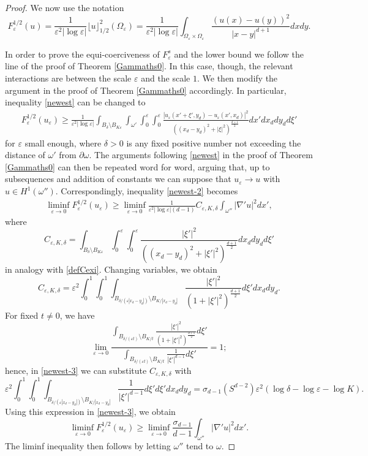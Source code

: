 \documentclass[11pt]{article}
\def\e{\varepsilon}
\begin{document}
\begin{proof} We now use the notation
$$
F^{1/2}_\e(u)=\frac{1}{\e^{2}|\log\e|}\lfloor u\rfloor_{1/2}^2(\Omega_\e)
=\frac{1}{\e^{2}|\log\e|}\int_{\Omega_\e\times\Omega_\e}\frac{(u(x)-u(y))^2}{|x-y|^{d+1}}dx dy.
$$

In order to prove the equi-coerciveness of $F^s_\e$ and the lower bound we follow the line of the proof of Theorem \ref{Gammaths0}. In this case, though, the relevant interactions are between the scale $\e$ and the scale $1$.
We then modify the argument in the proof of Theorem \ref{Gammaths0} accordingly.  In particular, inequality \eqref{newest} can be changed to 
\begin{eqnarray}
\label{newest-1}
F^{1/2}_\e(u_\e)\ge\frac{1}{\e^{2}
|\log\e|}\int_{B_\delta\setminus B_{K\e}}\int_{\omega'}
\int_0^\e\int_0^\e \frac{|u_\e(x'+\xi',y_d)-u_\e(x',x_d)|^2}{((x_d-y_d)^2+|\xi|^2)^{\frac{d+1}2}}dx' dx_d dy_d d\xi'
\end{eqnarray}
for $\e$ small enough, where $\delta>0$ is any fixed positive number not exceeding the distance of $\omega'$ from $\partial\omega$. 
The arguments following \eqref{newest} in the proof of Theorem \ref{Gammaths0} can then be repeated word for word, arguing that, up to subsequences and addition of constants we can suppose that $u_\e\to u$ with $u\in H^1(\omega'')$. Correspondingly, inequality \eqref{newest-2} becomes
\begin{eqnarray}\label{newest-3}
\liminf_{\e\to 0}F^{1/2}_\e(u_\e)\ge\liminf_{\e\to 0}\frac{1}{\e^{2}|\log\e|(d-1)}C_{\e,K,\delta}
\int_{\omega''} |\nabla' u|^2 dx',
\end{eqnarray}
where
$$C_{\e,K,\delta}=
\int_{B_\delta\setminus B_{K\e}}\int_0^\e\int_0^\e\frac{|\xi'|^2 }{((x_d-y_d)^2+|\xi'|^2)^{\frac{d+1}2}}dx_d dy_d d\xi'$$
in analogy with \eqref{defCexi}.
Changing variables, we obtain 
$$
C_{\e,K,\delta}=\e^2\int_0^1\int_0^1\int_{B_{\delta/(\e|x_d-y_d|)}\setminus B_{K/|x_d-y_d|}}\frac{|\xi'|^2 }{(1+|\xi'|^2)^{\frac{d+1}2}}d\xi'dx_d dy_d .
$$
For fixed $t\neq 0$, we have
$$
\lim_{\e\to 0}\frac{\displaystyle\int_{B_{\delta/(\e t)}\setminus B_{K/t}}\frac{|\xi'|^2 }{(1+|\xi'|^2)^{\frac{d+1}2}}d\xi'}{\displaystyle\int_{B_{\delta/(\e t)}\setminus B_{K/t}}\frac{1 }{|\xi'|^{d-1}}d\xi'}=1;
$$
hence, in \eqref{newest-3} we can substitute $C_{\e,K,\delta}$ with 
$$
\e^2\int_0^1\int_0^1\int_{B_{\delta/(\e|x_d-y_d|)}\setminus B_{K/|x_d-y_d|}}\frac{1 }{|\xi'|^{d-1}}d\xi'd\xi'dx_d dy_d=\sigma_{d-1}(S^{d-2})\e^2
(\log\delta-\log\e-\log K).
$$
Using this expression in \eqref{newest-3}, we obtain 
$$\liminf_{\e\to 0} F^{1/2}_\e(u_\e)\ge\liminf_{\e\to 0}\frac{
\sigma_{d-1}
}{d-1}
\int_{\omega''} |\nabla' u|^2 dx'.
$$
The liminf inequality then follows by letting $\omega''$ tend to $\omega$.


\end{proof}
\end{document}
